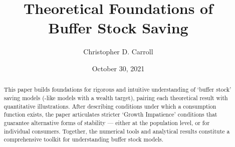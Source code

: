 \documentclass[BufferStockTheory]{subfiles}
\begin{document}
\providecommand{\versn}{pdf} %
\ifthenelse{\boolean{Web}}{    %
  \renewcommand{\versn}{Web}     %
  \renewcommand{\rootFromOut}{.} %
}{}  %


\title{Theoretical Foundations of \\ Buffer Stock Saving}

\author{Christopher D. Carroll\authNum}



\renewcommand{\forcedate}{October 30, 2021}\date{\forcedate}

\maketitle
\hypertarget{abstract}{}
\begin{abstract}
  This paper builds foundations for rigorous and intuitive understanding of `buffer stock' saving models (\cite{bewleyPIH}-like models with a wealth target), pairing each theoretical result with quantitative illustrations.  After describing conditions under which a consumption function exists, the paper articulates stricter `Growth Impatience' conditions that guarantee alternative forms of stability --- either at the population level, or for individual consumers.  Together, the numerical tools and analytical results constitute a comprehensive toolkit for understanding buffer stock models.
\end{abstract}


\hypertarget{links}{}
\end{document}

